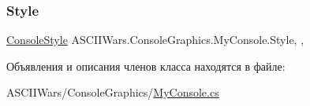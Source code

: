 \subsubsection{\texorpdfstring{Style}{Style}}
{\footnotesize\ttfamily \hyperlink{namespace_a_s_c_i_i_wars_1_1_console_graphics_a9b323f4b2bf48062c9245b24e74b2882}{Console\+Style} A\+S\+C\+I\+I\+Wars.\+Console\+Graphics.\+My\+Console.\+Style\hspace{0.3cm}{\ttfamily [static]}, {\ttfamily [get]}, {\ttfamily [set]}}



Объявления и описания членов класса находятся в файле\+:\begin{DoxyCompactItemize}
\item 
A\+S\+C\+I\+I\+Wars/\+Console\+Graphics/\hyperlink{_my_console_8cs}{My\+Console.\+cs}\end{DoxyCompactItemize}

